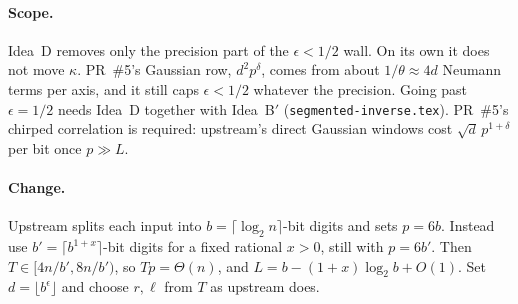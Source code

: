 \documentclass[11pt]{article}
\theoremstyle{remark}\newtheorem*{remark}{Remark}
\begin{document}
\paragraph{Scope.} Idea~D removes only the precision part of the $\epsilon<1/2$ wall. On its own it does not move $\kappa$. PR~\#5's Gaussian row, $d^2p^\delta$, comes from about $1/\theta\approx4d$ Neumann terms per axis, and it still caps $\epsilon<1/2$ whatever the precision. Going past $\epsilon=1/2$ needs Idea~D together with Idea~B$'$ (\texttt{segmented-inverse.tex}). PR~\#5's chirped correlation is required: upstream's direct Gaussian windows cost $\sqrt d\,p^{1+\delta}$ per bit once $p\gg L$.

\paragraph{Change.} Upstream splits each input into $b=\lceil\log_2n\rceil$-bit digits and
sets $p=6b$. Instead use $b'=\lceil b^{1+x}\rceil$-bit digits for a fixed rational $x>0$,
still with $p=6b'$. Then $T\in[4n/b',8n/b')$, so $Tp=\Theta(n)$, and
$L=b-(1+x)\log_2b+O(1)$. Set $d=\lfloor b^\epsilon\rfloor$ and choose $r,\ell$ from $T$ as
upstream does.
\end{document}
